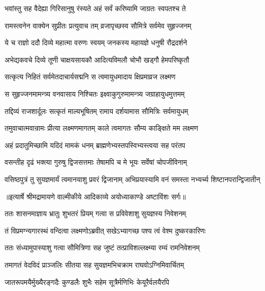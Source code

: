 \twolineshloka
{भवांस्तु सह वैदेह्या गिरिसानुषु रंस्यते}
{अहं सर्वं करिष्यामि जाग्रतः स्वपतश्च ते} %

\twolineshloka
{रामस्त्वनेन वाक्येन सुप्रीतः प्रत्युवाच तम्}
{व्रजापृच्छस्व सौमित्रे सर्वमेव सुहृज्जनम्} %

\twolineshloka
{ये च राज्ञो ददौ दिव्ये महात्मा वरुणः स्वयम्}
{जनकस्य महायज्ञे धनुषी रौद्रदर्शने} %

\twolineshloka
{अभेद्यकवचे दिव्ये तूणी चाक्षयसायकौ}
{आदित्यविमलौ चोभौ खड्गौ हेमपरिष्कृतौ} %

\twolineshloka
{सत्कृत्य निहितं सर्वमेतदाचार्यसद्मनि}
{स त्वमायुधमादाय क्षिप्रमाव्रज लक्ष्मण} %

\twolineshloka
{स सुहृज्जनमामन्त्र्य वनवासाय निश्चितः}
{इक्ष्वाकुगुरुमामन्त्र्य जग्राहायुधमुत्तमम्} %

\twolineshloka
{तद्दिव्यं राजशार्दूलः सत्कृतं माल्यभूषितम्}
{रामाय दर्शयामास सौमित्रिः सर्वमायुधम्} %

\twolineshloka
{तमुवाचात्मवान्रामः प्रीत्या लक्ष्मणमागतम्}
{काले त्वमागतः सौम्य काङ्क्षिते मम लक्ष्मण} %

\twolineshloka
{अहं प्रदातुमिच्छामि यदिदं मामकं धनम्}
{ब्राह्मणेभ्यस्तपस्विभ्यस्त्वया सह परंतप} %

\twolineshloka
{वसन्तीह दृढं भक्त्या गुरुषु द्विजसत्तमाः}
{तेषामपि च मे भूयः सर्वेषां चोपजीविनाम्} %

\fourlineindentedshloka
{वसिष्ठपुत्रं तु सुयज्ञमार्यं}
{ त्वमानयाशु प्रवरं द्विजानाम्}
{अभिप्रयास्यामि वनं समस्ता}
{नभ्यर्च्य शिष्टानपरान्द्विजातीन्} %


{॥इत्यार्षे श्रीमद्रामायणे वाल्मीकीये आदिकाव्ये अयोध्याकाण्डे अष्टाविंशः सर्गः॥}


\twolineshloka
{ततः शासनमाज्ञाय भ्रातुः शुभतरं प्रियम्}
{गत्वा स प्रविवेशाशु सुयज्ञस्य निवेशनम्} %

\twolineshloka
{तं विप्रमग्न्यगारस्थं वन्दित्वा लक्ष्मणोऽब्रवीत्}
{सखेऽभ्यागच्छ पश्य त्वं वेश्म दुष्करकारिणः} %

\twolineshloka
{ततः संध्यामुपास्याशु गत्वा सौमित्रिणा सह}
{जुष्टं तत्प्राविशल्लक्ष्म्या रम्यं रामनिवेशनम्} %

\twolineshloka
{तमागतं वेदविदं प्राञ्जलिः सीतया सह}
{सुयज्ञमभिचक्राम राघवोऽग्निमिवार्चितम्} %

\twolineshloka
{जातरूपमयैर्मुख्यैरङ्गदैः कुण्डलैः शुभैः}
{सहेम सूत्रैर्मणिभिः केयूरैर्वलयैरपि} %


